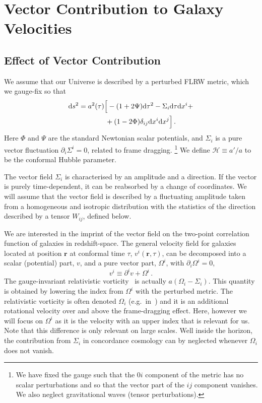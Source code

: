 \documentclass[a4paper,twocolumn,aps,prd,nolongbibliography,superscriptaddress,showpacs,showkeys,amsmath,amssymb,floatfix,nofootinbib]{revtex4-1}
\renewcommand{\[}{\begin{equation}}
\renewcommand{\]}{\end{equation}}
\begin{document}
\section{Vector Contribution to Galaxy Velocities}

\label{sec:vec_gen}

\subsection{Effect of Vector Contribution\label{sec:basics}}

We assume that our Universe is described by a perturbed FLRW metric, which we gauge-fix so that
\begin{align}
\mathrm{d}s^2 = a^2(\tau)&\Big[-(1+2\Psi)\mathrm{d}\tau^2 - \Sigma_i \mathrm{d}\tau\mathrm{d}x^i + \label{eq:metric}\\
&\,+(1-2\Phi)\delta_{ij}\mathrm{d}x^i\mathrm{d}x^j\Big] \,. \notag
\end{align}
Here $\Phi$ and $\Psi$ are the standard Newtonian scalar potentials, and $\Sigma_i$ is a pure vector fluctuation  $\partial_i\Sigma^i=0$, related to frame dragging.%
\footnote{We have fixed the gauge such that the $0i$ component of the metric has no scalar perturbations and so that the vector part of the $ij$ component vanishes. We also neglect gravitational waves (tensor perturbations).} %
We define $\mathcal{H}\equiv a'/a$ to be the conformal Hubble parameter.

The vector field $\Sigma_i$ is characterised by an amplitude and a direction. If the vector is purely time-dependent, it can be reabsorbed by a change of coordinates. We will assume that the vector field is described by a fluctuating amplitude taken from a homogeneous and isotropic distribution with the statistics of the direction described by a  tensor $W_{ij}$, defined below.

We are interested in the imprint of the vector field on the two-point correlation function of galaxies in redshift-space. The general velocity field for galaxies located at position $\boldsymbol{r}$ at conformal time $\tau$, $v^i(\boldsymbol{r},\tau)$, can be decomposed into a scalar (potential) part, $v$, and a pure vector part, $\Omega^i$, with $\partial_i\Omega^i =0$, 
\begin{equation}
v^{i}\equiv \partial^{i}v+\Omega^{i} \,.\label{eq:vel}
\end{equation}
The gauge-invariant relativistic vorticity~\cite{Rbook} is actually $a(\Omega_i-\Sigma_i)$.  This quantity is obtained by lowering the index from $\Omega^i$ with the perturbed metric. The relativistic vorticity is often denoted $\Omega_i$ (e.g.\ in~\cite{Lu:2008ju,Rbook}) and it is an additional rotational velocity over and above the frame-dragging effect. Here, however we will focus on $\Omega^i$ as it is the velocity with an upper index that is relevant for us. Note that this difference is only relevant on large scales. Well inside the horizon, the contribution from $\Sigma_i$ in concordance cosmology can by neglected whenever $\Omega_i$ does not vanish.
\end{document}
